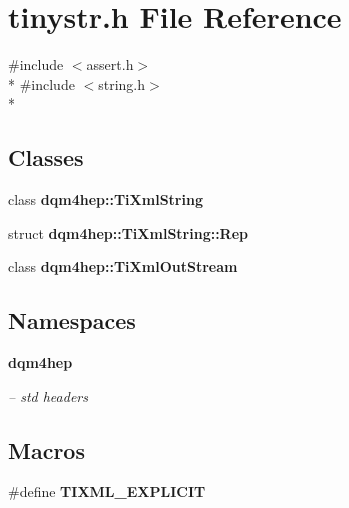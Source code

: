 \section{tinystr.\+h File Reference}
\label{tinystr_8h}
{\ttfamily \#include $<$assert.\+h$>$}\\*
{\ttfamily \#include $<$string.\+h$>$}\\*
\subsection*{Classes}
\begin{DoxyCompactItemize}
\item 
class {\bf dqm4hep\+::\+Ti\+Xml\+String}
\item 
struct {\bf dqm4hep\+::\+Ti\+Xml\+String\+::\+Rep}
\item 
class {\bf dqm4hep\+::\+Ti\+Xml\+Out\+Stream}
\end{DoxyCompactItemize}
\subsection*{Namespaces}
\begin{DoxyCompactItemize}
\item 
 {\bf dqm4hep}
\begin{DoxyCompactList}\small\item\em -- std headers \end{DoxyCompactList}\end{DoxyCompactItemize}
\subsection*{Macros}
\begin{DoxyCompactItemize}
\item 
\#define {\bf T\+I\+X\+M\+L\+\_\+\+E\+X\+P\+L\+I\+C\+I\+T}
\end{DoxyCompactItemize}
